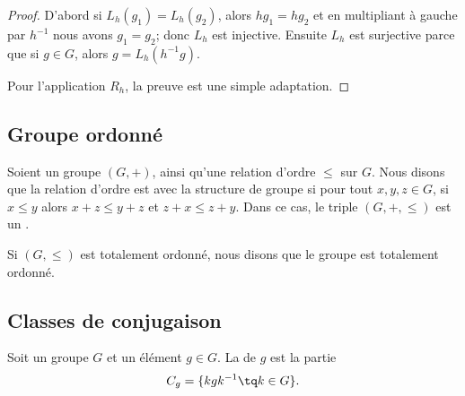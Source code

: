 \begin{proof}
	D'abord si \( L_h(g_1)=L_h(g_2)\), alors \( hg_1=hg_2\) et en multipliant à gauche par \( h^{-1}\) nous avons \( g_1=g_2\); donc \( L_h\) est injective. Ensuite \( L_h\) est surjective parce que si \( g\in G\), alors \( g=L_h(h^{-1} g)\).

	Pour l'application \( R_h\), la preuve est une simple adaptation.
\end{proof}

\subsection{Groupe ordonné}

\begin{definition}        \label{DEFooEUHFooYvhnLQ}
	Soient un groupe \( (G,+)\), ainsi qu'une relation d'ordre \( \leq\) sur \( G\). Nous disons que la relation d'ordre est  avec la structure de groupe si pour tout \( x,y,z\in G\), si \( x\leq y\) alors \( x+z\leq y+z\) et \( z+x\leq z+y\). Dans ce cas, le triple \( (G,+,\leq)\) est un .

	Si \( (G,\leq)\) est totalement ordonné, nous disons que le groupe est totalement ordonné.
\end{definition}

\subsection{Classes de conjugaison}

\begin{definition}       \label{DEFooOLXPooWelsZV}
	Soit un groupe \( G\) et un élément \( g\in G\). La  de \( g\) est la partie
	\begin{equation}
		C_g=\{ kgk^{-1}\tq k\in G \}.
	\end{equation}
\end{definition}

